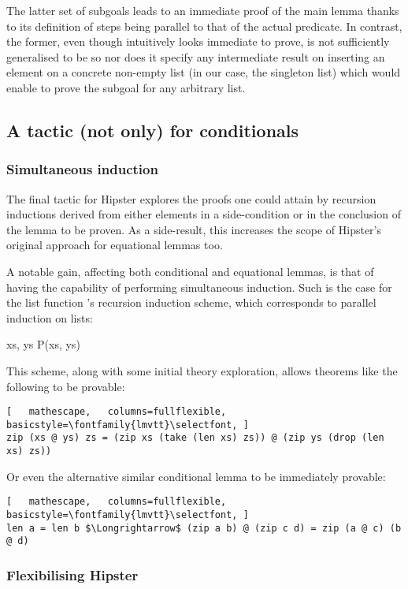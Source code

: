 The latter set of subgoals leads to an immediate proof of the main lemma thanks to its definition of steps being parallel to that of the actual predicate.
%
In contrast, the former, even though intuitively looks immediate to prove, is not sufficiently generalised to be so nor does it specify any intermediate result on inserting an element on a concrete non-empty list (in our case, the singleton list) which would enable to prove the subgoal for any arbitrary list.


\subsection{A tactic (not only) for conditionals}

\subsubsection*{Simultaneous induction}

The final tactic for Hipster explores the proofs one could attain by recursion inductions derived from either elements in a side-condition or in the conclusion of the lemma to be proven.
%
As a side-result, this increases the scope of Hipster's original approach for equational lemmas too.

A notable gain, affecting both conditional and equational lemmas, is that of having the capability of performing simultaneous induction.
%
Such is the case for the list function 's recursion induction scheme, which corresponds to parallel induction on lists:

  {\forall xs, \; ys \;\; P\;(xs,\; ys)}

\noindent This scheme, along with some initial theory exploration, allows theorems like the following to be provable:

\begin{lstlisting}[   mathescape,   columns=fullflexible,   basicstyle=\fontfamily{lmvtt}\selectfont, ]
zip (xs @ ys) zs = (zip xs (take (len xs) zs)) @ (zip ys (drop (len xs) zs))
\end{lstlisting}

\noindent Or even the alternative similar conditional lemma to be immediately provable:

\begin{lstlisting}[   mathescape,   columns=fullflexible,   basicstyle=\fontfamily{lmvtt}\selectfont, ]
len a = len b $\Longrightarrow$ (zip a b) @ (zip c d) = zip (a @ c) (b @ d)
\end{lstlisting}


\subsubsection*{Flexibilising Hipster}





